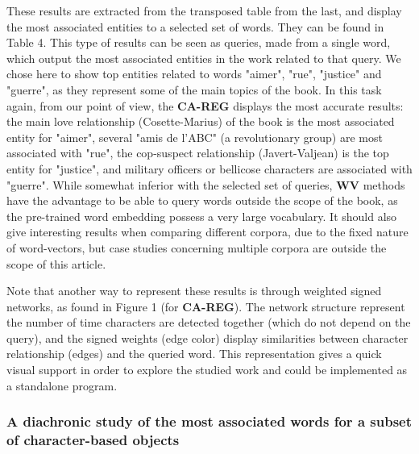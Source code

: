 \documentclass[
twocolumn,
]{ceurart}
\begin{document}
These results are extracted from the transposed table from the last, and display the most associated entities to a selected set of words. They can be found in Table 4. This type of results can be seen as queries, made from a single word, which output the most associated entities in the work related to that query. We chose here to show top entities related to words "aimer", "rue", "justice" and "guerre", as they represent some of the main topics of the book. In this task again, from our point of view, the \textbf{CA-REG} displays the most accurate results: the main love relationship (Cosette-Marius) of the book is the most associated entity for "aimer", several "amis de l'ABC" (a revolutionary group) are most associated with "rue", the cop-suspect relationship (Javert-Valjean) is the top entity for "justice", and military officers or bellicose characters are associated with "guerre". While somewhat inferior with the selected set of queries, \textbf{WV} methods have the advantage to be able to query words outside the scope of the book, as the pre-trained word embedding possess a very large vocabulary. It should also give interesting results when comparing different corpora, due to the fixed nature of word-vectors, but case studies concerning multiple corpora are outside the scope of this article.

Note that another way to represent these results is through weighted signed networks, as found in Figure 1 (for \textbf{CA-REG}). The network structure represent the number of time characters are detected together (which do not depend on the query), and the signed weights (edge color) display similarities between character relationship (edges) and the queried word. This representation gives a quick visual support in order to explore the studied work and could be implemented as a standalone program.


\subsubsection{A diachronic study of the most associated words for a subset of character-based objects}
\label{diachronic}
\end{document}
